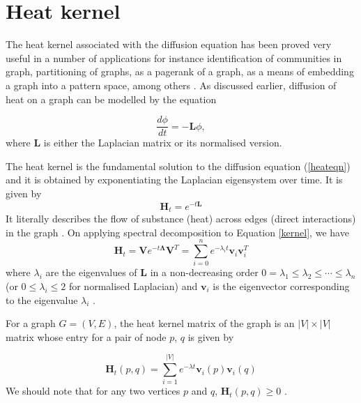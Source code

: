 \documentclass[10pt,a4paper]{article}
\theoremstyle{plain}
\theoremstyle{definition}
\begin{document}
       
        \newpage
        \section{Heat kernel}
        The heat kernel associated with the diffusion equation has been proved very useful in a number of applications for instance identification of communities in graph, partitioning of graphs, as a pagerank of a graph, as a means of embedding a graph into a pattern space, among others \citep{chung2007heat,chung2009local,kloster2014heat}. 
        As discussed earlier, diffusion of heat on a graph can be modelled by the equation 
        
        \begin{equation}
        \frac{d \phi}{dt} = -\mathbf{L} \phi,
        \label{heateqn}
        \end{equation}
        where $\mathbf{L}$ is either the Laplacian matrix or its normalised version. 
        
        The heat kernel is the fundamental solution to the diffusion equation (\ref{heateqn}) and it is obtained by exponentiating the Laplacian eigensystem over time. It is given by
        \begin{equation}
        \mathbf{H}_t = e^{-t \mathbf{L}} 
        \label{kernel}
        \end{equation}
        It literally describes the flow of substance (heat) across edges (direct interactions) in the graph \citep{xiao2009graph}.
        On applying spectral decomposition to Equation \ref{kernel}, we have 
        \begin{equation}
        \mathbf{H}_t = \mathbf{V} e^{-t \mathbf{\Lambda}} \mathbf{V}^T =  \sum_{i=0}^n e^{-\lambda_i t} \mathbf{v}_i \mathbf{v}_i^T 
        \label{decomp}
        \end{equation}
        where $\lambda_i$ are the eigenvalues of $\mathbf{L}$ in a non-decreasing order $0=\lambda_1 \leq  \lambda_2 \leq \cdots \leq \lambda_n$ (or $0 \leq \lambda_i \leq 2$ for normalised Laplacian) and $\mathbf{v}_i$ is the eigenvector corresponding to the eigenvalue $\lambda_i$ \citep{anton2007elementary}.
        
        For a graph $G=(V,E)$, the heat kernel matrix of the graph is an $|V| \times |V|$ matrix whose entry for a pair of node $p$, $q$ is given by 
        
        \begin{equation}
        \mathbf{H}_t(p,q) = \sum_{i=1}^{|V|} e^{-\lambda t} \mathbf{v}_i(p) \mathbf{v}_i(q)
        \end{equation} 
        We should note that for any two vertices $p$ and $q$, $\mathbf{H}_t(p,q) \geq 0$ \citep{chung1997spectral}.
        
\end{document}
